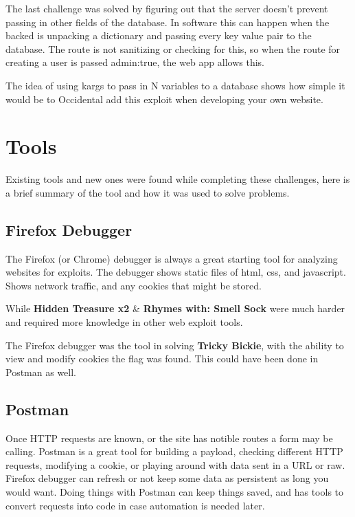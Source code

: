 \documentclass{article}
\begin{document}
The last challenge was solved by figuring out that the server doesn't prevent passing in other fields of the database.  In software this can happen when the backed is unpacking a dictionary and passing every key value pair to the database.  The route is not sanitizing or checking for this, so when the route for creating a user is passed admin:true, the web app allows this.

The idea of using kargs to pass in N variables to a database shows how simple it would be to Occidental add this exploit when developing your own website.

\section{Tools}

Existing tools and new ones were found while completing these challenges, here is a brief summary of the tool and how it was used to solve problems.

\subsection{Firefox Debugger}

The Firefox (or Chrome) debugger is always a great starting tool for analyzing websites for exploits.  The debugger shows static files of html, css, and javascript.  Shows network traffic, and any cookies that might be stored.

While {\bf Hidden Treasure x2} \& {\bf Rhymes with: Smell Sock} were much harder and required more knowledge in other web exploit tools.

The Firefox debugger was the tool in solving {\bf Tricky Bickie}, with the ability to view and modify cookies the flag was found.  This could have been done in Postman as well. 

\subsection{Postman}

Once HTTP requests are known, or the site has notible routes a form may be calling.  Postman is a great tool for building a payload, checking different HTTP requests, modifying a cookie, or playing around with data sent in a URL or raw.  Firefox debugger can refresh or not keep some data as persistent as long you would want.  Doing things with Postman can keep things saved, and has tools to convert requests into code in case automation is needed later.
\end{document}

